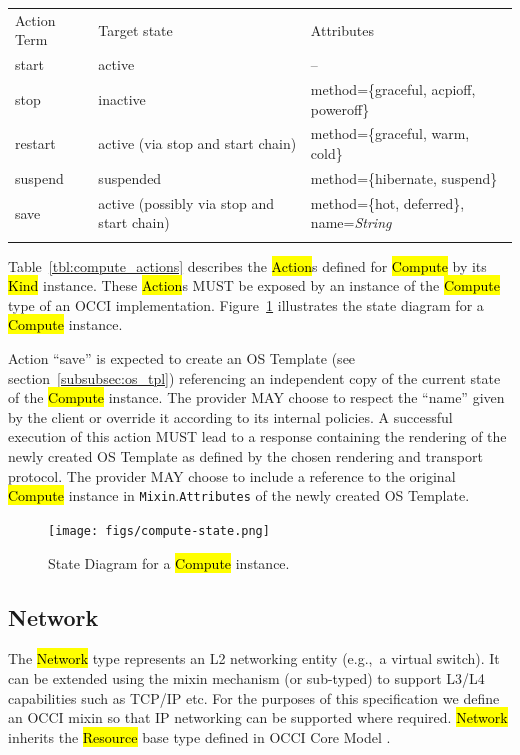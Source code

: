 \documentclass[10pt,a4paper]{article}
\begin{document}
{
	\begin{tabular}{lll}
	\toprule
	Action Term & Target state & Attributes \\
	\colrule
	start & active & -- \\
	stop & inactive & method=\{graceful, acpioff, poweroff\} \\
	restart & active (via stop and start chain) & method=\{graceful, warm, cold\} \\
	suspend & suspended & method=\{hibernate, suspend\} \\
	save & active (possibly via stop and start chain) & method=\{hot, deferred\}, name=\emph{String} \\
	\botrule
	\end{tabular}
}

Table~\ref{tbl:compute_actions} describes the \hl{Action}s defined for
\hl{Compute} by its \hl{Kind} instance. These \hl{Action}s MUST be
exposed by an instance of the \hl{Compute} type of an OCCI
implementation.  Figure~\ref{fig:compute_state} illustrates the state
diagram for a \hl{Compute} instance.

Action ``save'' is expected to create an OS Template (see section~\ref{subsubsec:os_tpl}) referencing
an independent copy of the current state of the \hl{Compute} instance. The provider MAY choose to respect
the ``name'' given by the client or override it according to its internal policies. A successful
execution of this action MUST lead to a response containing the rendering of the newly
created OS Template as defined by the chosen rendering and transport protocol.
The provider MAY choose to include a reference to the original \hl{Compute} instance
in {\tt Mixin}.{\tt Attributes} of the newly created OS Template.

\begin{figure}[!h]
	\centering
	\texttt{[image: figs/compute-state.png]}
	\caption{State Diagram for a \hl{Compute} instance.}
	\label{fig:compute_state}
\end{figure}

\subsection{Network}
The \hl{Network} type represents an L2 networking entity (e.g.,~a
virtual switch). It can be extended using the mixin mechanism (or
sub-typed) to support L3/L4 capabilities such as TCP/IP etc.  For the
purposes of this specification we define an OCCI mixin so that IP
networking can be supported where required. \hl{Network} inherits the
\hl{Resource} base type defined in OCCI Core Model \cite{occi:core}.
\end{document}
